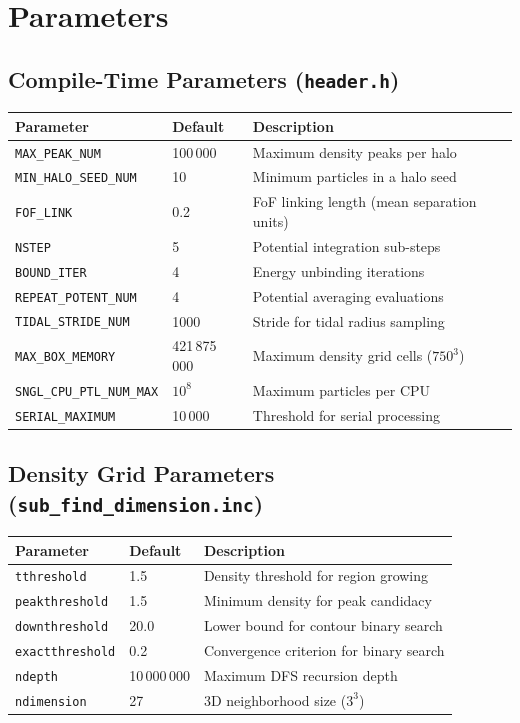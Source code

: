 \documentclass[11pt,fleqn]{book}
\newcommand{\code}[1]{\texttt{#1}}
\newcommand{\file}[1]{\texttt{#1}}
\begin{document}
\section{Parameters}

\subsection{Compile-Time Parameters (\file{header.h})}

\begin{longtable}{L{5cm} C{2cm} L{6.5cm}}
\toprule
\textbf{Parameter} & \textbf{Default} & \textbf{Description} \\
\midrule
\endhead
\code{MAX\_PEAK\_NUM}          & 100\,000     & Maximum density peaks per halo \\
\code{MIN\_HALO\_SEED\_NUM}    & 10           & Minimum particles in a halo seed \\
\code{FOF\_LINK}               & 0.2          & FoF linking length (mean separation units) \\
\code{NSTEP}                   & 5            & Potential integration sub-steps \\
\code{BOUND\_ITER}             & 4            & Energy unbinding iterations \\
\code{REPEAT\_POTENT\_NUM}     & 4            & Potential averaging evaluations \\
\code{TIDAL\_STRIDE\_NUM}      & 1000         & Stride for tidal radius sampling \\
\code{MAX\_BOX\_MEMORY}        & 421\,875\,000 & Maximum density grid cells ($750^3$) \\
\code{SNGL\_CPU\_PTL\_NUM\_MAX} & $10^8$      & Maximum particles per CPU \\
\code{SERIAL\_MAXIMUM}         & 10\,000      & Threshold for serial processing \\
\bottomrule
\end{longtable}

\subsection{Density Grid Parameters (\file{sub\_find\_dimension.inc})}

\begin{longtable}{L{5cm} C{2cm} L{6.5cm}}
\toprule
\textbf{Parameter} & \textbf{Default} & \textbf{Description} \\
\midrule
\endhead
\code{tthreshold}     & 1.5           & Density threshold for region growing \\
\code{peakthreshold}  & 1.5           & Minimum density for peak candidacy \\
\code{downthreshold}  & 20.0          & Lower bound for contour binary search \\
\code{exactthreshold} & 0.2           & Convergence criterion for binary search \\
\code{ndepth}         & 10\,000\,000  & Maximum DFS recursion depth \\
\code{ndimension}     & 27            & 3D neighborhood size ($3^3$) \\
\bottomrule
\end{longtable}
\end{document}
